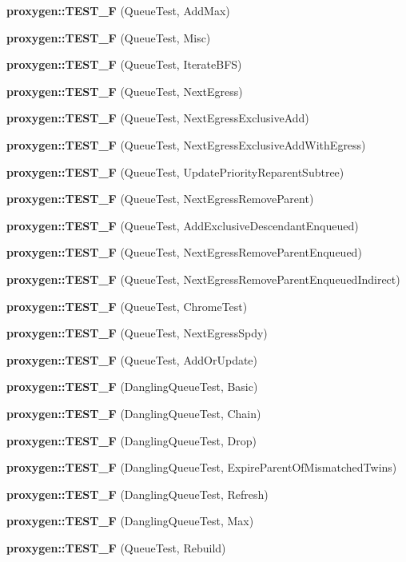 \begin{DoxyCompactItemize}
{\bf proxygen\+::\+T\+E\+S\+T\+\_\+F} (Queue\+Test, Add\+Max)
\item 
{\bf proxygen\+::\+T\+E\+S\+T\+\_\+F} (Queue\+Test, Misc)
\item 
{\bf proxygen\+::\+T\+E\+S\+T\+\_\+F} (Queue\+Test, Iterate\+B\+FS)
\item 
{\bf proxygen\+::\+T\+E\+S\+T\+\_\+F} (Queue\+Test, Next\+Egress)
\item 
{\bf proxygen\+::\+T\+E\+S\+T\+\_\+F} (Queue\+Test, Next\+Egress\+Exclusive\+Add)
\item 
{\bf proxygen\+::\+T\+E\+S\+T\+\_\+F} (Queue\+Test, Next\+Egress\+Exclusive\+Add\+With\+Egress)
\item 
{\bf proxygen\+::\+T\+E\+S\+T\+\_\+F} (Queue\+Test, Update\+Priority\+Reparent\+Subtree)
\item 
{\bf proxygen\+::\+T\+E\+S\+T\+\_\+F} (Queue\+Test, Next\+Egress\+Remove\+Parent)
\item 
{\bf proxygen\+::\+T\+E\+S\+T\+\_\+F} (Queue\+Test, Add\+Exclusive\+Descendant\+Enqueued)
\item 
{\bf proxygen\+::\+T\+E\+S\+T\+\_\+F} (Queue\+Test, Next\+Egress\+Remove\+Parent\+Enqueued)
\item 
{\bf proxygen\+::\+T\+E\+S\+T\+\_\+F} (Queue\+Test, Next\+Egress\+Remove\+Parent\+Enqueued\+Indirect)
\item 
{\bf proxygen\+::\+T\+E\+S\+T\+\_\+F} (Queue\+Test, Chrome\+Test)
\item 
{\bf proxygen\+::\+T\+E\+S\+T\+\_\+F} (Queue\+Test, Next\+Egress\+Spdy)
\item 
{\bf proxygen\+::\+T\+E\+S\+T\+\_\+F} (Queue\+Test, Add\+Or\+Update)
\item 
{\bf proxygen\+::\+T\+E\+S\+T\+\_\+F} (Dangling\+Queue\+Test, Basic)
\item 
{\bf proxygen\+::\+T\+E\+S\+T\+\_\+F} (Dangling\+Queue\+Test, Chain)
\item 
{\bf proxygen\+::\+T\+E\+S\+T\+\_\+F} (Dangling\+Queue\+Test, Drop)
\item 
{\bf proxygen\+::\+T\+E\+S\+T\+\_\+F} (Dangling\+Queue\+Test, Expire\+Parent\+Of\+Mismatched\+Twins)
\item 
{\bf proxygen\+::\+T\+E\+S\+T\+\_\+F} (Dangling\+Queue\+Test, Refresh)
\item 
{\bf proxygen\+::\+T\+E\+S\+T\+\_\+F} (Dangling\+Queue\+Test, Max)
\item 
{\bf proxygen\+::\+T\+E\+S\+T\+\_\+F} (Queue\+Test, Rebuild)
\end{DoxyCompactItemize}
